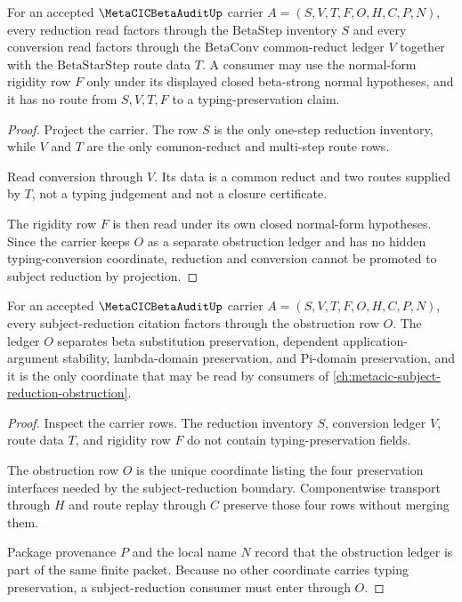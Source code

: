 \begin{theorem}
\label{thm:metacic-beta-audit-reduction-conversion-boundary}
For an accepted $\MetaCICBetaAuditUp$ carrier $A=(S,V,T,F,O,H,C,P,N)$, every reduction read factors through the $\mathrm{BetaStep}$ inventory $S$ and every conversion read factors through the $\mathrm{BetaConv}$ common-reduct ledger $V$ together with the $\mathrm{BetaStarStep}$ route data $T$. A consumer may use the normal-form rigidity row $F$ only under its displayed closed beta-strong normal hypotheses, and it has no route from $S,V,T,F$ to a typing-preservation claim.
\end{theorem}
\begin{proof}
Project the carrier. The row $S$ is the only one-step reduction inventory, while $V$ and $T$ are the only common-reduct and multi-step route rows.

Read conversion through $V$. Its data is a common reduct and two routes supplied by $T$, not a typing judgement and not a closure certificate.

The rigidity row $F$ is then read under its own closed normal-form hypotheses. Since the carrier keeps $O$ as a separate obstruction ledger and has no hidden typing-conversion coordinate, reduction and conversion cannot be promoted to subject reduction by projection.
\end{proof}

\begin{theorem}
\label{thm:metacic-beta-audit-subject-reduction-obstruction-ledger}
For an accepted $\MetaCICBetaAuditUp$ carrier $A=(S,V,T,F,O,H,C,P,N)$, every subject-reduction citation factors through the obstruction row $O$. The ledger $O$ separates beta substitution preservation, dependent application-argument stability, lambda-domain preservation, and Pi-domain preservation, and it is the only coordinate that may be read by consumers of \autoref{ch:metacic-subject-reduction-obstruction}.
\end{theorem}
\begin{proof}
Inspect the carrier rows. The reduction inventory $S$, conversion ledger $V$, route data $T$, and rigidity row $F$ do not contain typing-preservation fields.

The obstruction row $O$ is the unique coordinate listing the four preservation interfaces needed by the subject-reduction boundary. Componentwise transport through $H$ and route replay through $C$ preserve those four rows without merging them.

Package provenance $P$ and the local name $N$ record that the obstruction ledger is part of the same finite packet. Because no other coordinate carries typing preservation, a subject-reduction consumer must enter through $O$.
\end{proof}

